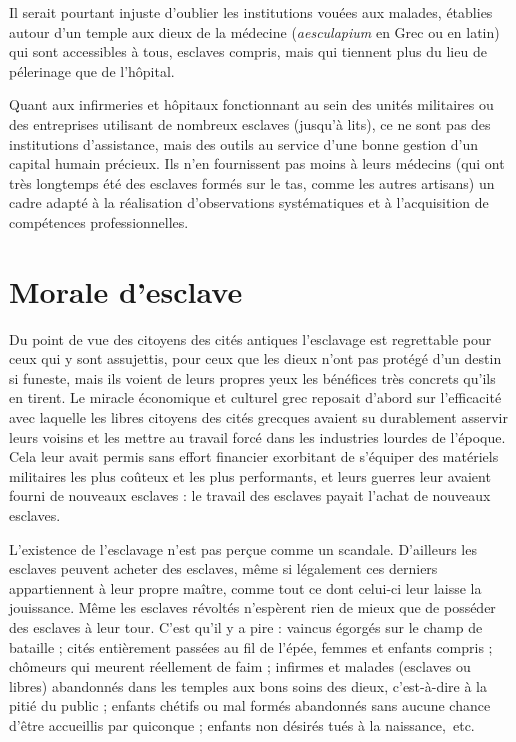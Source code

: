 Il serait pourtant injuste d'oublier les institutions vouées aux malades, établies %
autour d'un temple aux dieux de la médecine (\emph{aesculapium} en Grec ou  en latin) qui sont accessibles à tous, esclaves compris, mais qui tiennent plus du lieu de pélerinage que de l'hôpital. 

 Quant aux infirmeries et hôpitaux fonctionnant au sein des unités militaires ou des entreprises utilisant de nombreux esclaves (jusqu'à  lits), ce ne sont pas des institutions d'assistance, mais des outils au service d'une bonne gestion d'un capital humain précieux. Ils n'en fournissent pas moins à leurs médecins (qui ont très longtemps été des esclaves formés sur le tas, comme les autres artisans) un cadre adapté à la réalisation d'observations systématiques et à l'acquisition de compétences professionnelles.


\section{Morale d'esclave}

 Du point de vue des citoyens des cités antiques l'esclavage est regrettable pour ceux qui y sont assujettis, pour ceux que les dieux n'ont pas protégé d'un destin si funeste, mais ils voient de leurs propres yeux les bénéfices très concrets qu'ils en tirent. Le miracle économique et culturel grec reposait d'abord sur l'efficacité avec laquelle les libres citoyens des cités grecques avaient su durablement asservir leurs voisins et les mettre au travail forcé dans les industries lourdes de l'époque. Cela leur avait permis sans effort financier exorbitant de s'équiper des matériels militaires les plus coûteux et les plus performants, et leurs guerres leur avaient fourni de nouveaux esclaves : le travail des esclaves payait l'achat de nouveaux esclaves. 
 
  L'existence de l'esclavage n'est pas perçue comme un scandale. D'ailleurs les esclaves peuvent acheter des esclaves, même si légalement ces derniers appartiennent à leur propre maître, comme tout ce dont celui-ci leur laisse la jouissance. Même les esclaves révoltés n'espèrent rien de mieux que de posséder des esclaves à leur tour. C'est qu'il y a pire : vaincus égorgés sur le champ de bataille ; cités entièrement passées au fil de l'épée, femmes et enfants compris ; chômeurs qui meurent réellement de faim ; infirmes et malades (esclaves ou libres) abandonnés dans les temples aux bons soins des dieux, c'est-à-dire à la pitié du public ; enfants chétifs ou mal formés abandonnés sans aucune chance d'être accueillis par quiconque ; enfants non désirés tués à la naissance,~etc.

